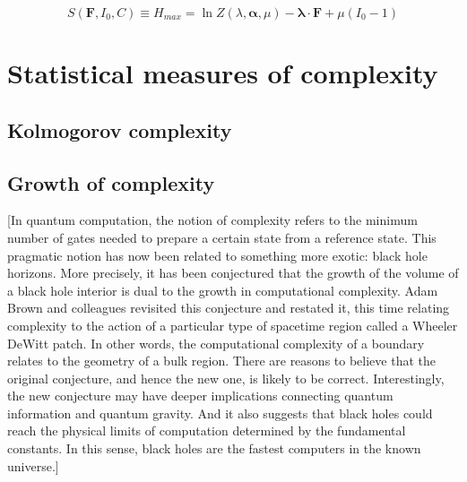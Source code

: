 \documentclass[a4paper,12pt]{article}
\begin{document}
\begin{equation}
  S(\bm{F}, I_0, C) \equiv H_{max} = \ln Z(\lambda, \bm{\alpha}, \mu) - \bm{\lambda} \cdot \bm{F} + \mu(I_0 -1)
\end{equation}

\section{Statistical measures of complexity}
\subsection{Kolmogorov complexity}

\subsection{Growth of complexity}


[In quantum computation, the notion of complexity refers to the minimum number of gates needed to prepare a certain state from a reference state. This pragmatic notion has now been related to something more exotic: black hole horizons. More precisely, it has been conjectured that the growth of the volume of a black hole interior is dual to the growth in computational complexity. Adam Brown and colleagues revisited this conjecture and restated it, this time relating complexity to the action of a particular type of spacetime region called a Wheeler DeWitt patch. In other words, the computational complexity of a boundary relates to the geometry of a bulk region.
There are reasons to believe that the original conjecture, and hence the new one, is likely to be correct. Interestingly, the new conjecture may have deeper implications connecting quantum information and quantum gravity. And it also suggests that black holes could reach the physical limits of computation determined by the fundamental constants. In this sense, black holes are the fastest computers in the known universe.]




\newpage



\end{document}
